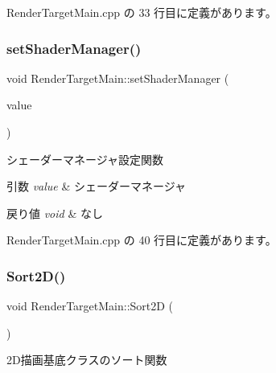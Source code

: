  Render\+Target\+Main.\+cpp の 33 行目に定義があります。

\mbox{\label{class_render_target_main_ae41a70c604737348419502b56720c84b}} 
\subsubsection{\texorpdfstring{set\+Shader\+Manager()}{setShaderManager()}}
{\footnotesize\ttfamily void Render\+Target\+Main\+::set\+Shader\+Manager (\begin{DoxyParamCaption}\item[{\mbox{\hyperlink{class_shader_manager}{Shader\+Manager}} $\ast$}]{value }\end{DoxyParamCaption})}



シェーダーマネージャ設定関数 


\begin{DoxyParams}{引数}
{\em value} & シェーダーマネージャ \\
\hline
\end{DoxyParams}

\begin{DoxyRetVals}{戻り値}
{\em void} & なし \\
\hline
\end{DoxyRetVals}


 Render\+Target\+Main.\+cpp の 40 行目に定義があります。

\mbox{\label{class_render_target_main_a8a69114ba02941a5da78630c29417b8e}} 
\subsubsection{\texorpdfstring{Sort2\+D()}{Sort2D()}}
{\footnotesize\ttfamily void Render\+Target\+Main\+::\+Sort2D (\begin{DoxyParamCaption}{ }\end{DoxyParamCaption})\hspace{0.3cm}{\ttfamily [private]}}



2\+D描画基底クラスのソート関数 


